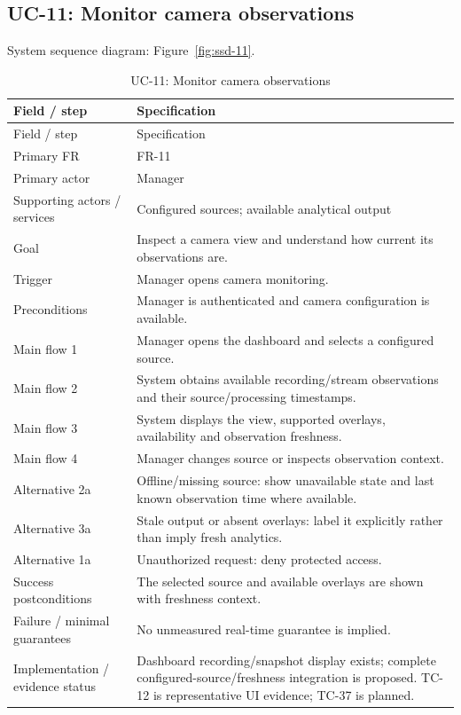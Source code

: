 \subsection*{UC-11: Monitor camera observations}
\label{uc:11}
System sequence diagram: Figure~\ref{fig:ssd-11}.

\begin{longtable}{P{0.23\textwidth}P{0.67\textwidth}}
\caption{UC-11: Monitor camera observations}\\
\toprule
Field / step & Specification\\
\midrule
\endfirsthead
\toprule
Field / step & Specification\\
\midrule
\endhead
Primary FR & FR-11\\
Primary actor & Manager\\
Supporting actors / services & Configured sources; available analytical output\\
Goal & Inspect a camera view and understand how current its observations are.\\
Trigger & Manager opens camera monitoring.\\
Preconditions & Manager is authenticated and camera configuration is available.\\
Main flow 1 & Manager opens the dashboard and selects a configured source.\\
Main flow 2 & System obtains available recording/stream observations and their source/processing timestamps.\\
Main flow 3 & System displays the view, supported overlays, availability and observation freshness.\\
Main flow 4 & Manager changes source or inspects observation context.\\
Alternative 2a & Offline/missing source: show unavailable state and last known observation time where available.\\
Alternative 3a & Stale output or absent overlays: label it explicitly rather than imply fresh analytics.\\
Alternative 1a & Unauthorized request: deny protected access.\\
Success postconditions & The selected source and available overlays are shown with freshness context.\\
Failure / minimal guarantees & No unmeasured real-time guarantee is implied.\\
Implementation / evidence status & Dashboard recording/snapshot display exists; complete configured-source/freshness integration is proposed. TC-12 is representative UI evidence; TC-37 is planned.\\
\bottomrule
\end{longtable}

